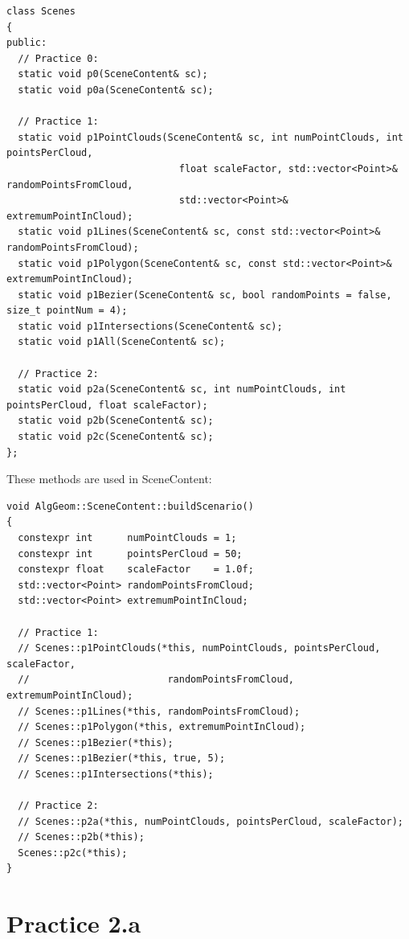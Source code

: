 \documentclass[12pt,a4paper,english]{article}
\begin{document}
\begin{verbatim}
class Scenes
{
public:
  // Practice 0:
  static void p0(SceneContent& sc);
  static void p0a(SceneContent& sc);

  // Practice 1:
  static void p1PointClouds(SceneContent& sc, int numPointClouds, int pointsPerCloud,
                              float scaleFactor, std::vector<Point>& randomPointsFromCloud,
                              std::vector<Point>& extremumPointInCloud);
  static void p1Lines(SceneContent& sc, const std::vector<Point>& randomPointsFromCloud);
  static void p1Polygon(SceneContent& sc, const std::vector<Point>& extremumPointInCloud);
  static void p1Bezier(SceneContent& sc, bool randomPoints = false, size_t pointNum = 4);
  static void p1Intersections(SceneContent& sc);
  static void p1All(SceneContent& sc);

  // Practice 2:
  static void p2a(SceneContent& sc, int numPointClouds, int pointsPerCloud, float scaleFactor);
  static void p2b(SceneContent& sc);
  static void p2c(SceneContent& sc);
};
\end{verbatim}

These methods are used in SceneContent:

\begin{verbatim}
void AlgGeom::SceneContent::buildScenario()
{
  constexpr int      numPointClouds = 1;
  constexpr int      pointsPerCloud = 50;
  constexpr float    scaleFactor    = 1.0f;
  std::vector<Point> randomPointsFromCloud;
  std::vector<Point> extremumPointInCloud;

  // Practice 1:
  // Scenes::p1PointClouds(*this, numPointClouds, pointsPerCloud, scaleFactor,
  //                        randomPointsFromCloud, extremumPointInCloud);
  // Scenes::p1Lines(*this, randomPointsFromCloud);
  // Scenes::p1Polygon(*this, extremumPointInCloud);
  // Scenes::p1Bezier(*this);
  // Scenes::p1Bezier(*this, true, 5);
  // Scenes::p1Intersections(*this);

  // Practice 2:
  // Scenes::p2a(*this, numPointClouds, pointsPerCloud, scaleFactor);
  // Scenes::p2b(*this);
  Scenes::p2c(*this);
}
\end{verbatim}

\newpage

\section{Practice 2.a}
\end{document}
